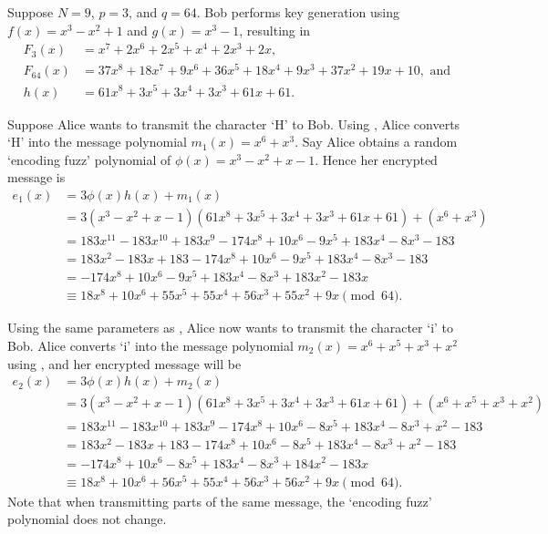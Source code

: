 \begin{example}\label{example-ntru-case-1}
    Suppose $N = 9$, $p = 3$, and $q = 64$. Bob performs key generation using $f(x) = x^3 - x^2 + 1$ and $g(x) = x^3 - 1$, resulting in
    \begin{align*}
        F_3(x) &= x^7 + 2x^6 + 2x^5 +x^4 + 2x^3 + 2x,\\
        F_{64}(x) &= 37x^8 + 18x^7 + 9x^6 + 36x^5 + 18x^4 + 9x^3 + 37x^2 + 19x + 10, \text{ and}\\
        h(x) &= 61x^8 + 3x^5 + 3x^4 + 3x^3 + 61x + 61.
    \end{align*}

    Suppose Alice wants to transmit the character `H' to Bob. Using , Alice converts `H' into the message polynomial $m_1(x) = x^6 + x^3$. Say Alice obtains a random `encoding fuzz' polynomial of $\phi(x) = x^{3} - x^{2} + x - 1$. Hence her encrypted message is
    \begin{align*}
        e_1(x) &= 3\phi(x)h(x) + m_1(x)\\
        &= 3(x^3 -x^2 +x - 1)(61x^8 + 3x^5 + 3x^4 + 3x^3 + 61x + 61) + (x^6 + x^3)\\
        &= 183x^{11} - 183x^{10} + 183x^9 - 174x^8 + 10x^6 - 9x^5 + 183x^4 - 8x^3 - 183\\
        &= 183x^2 - 183x + 183 - 174x^8 + 10x^6 - 9x^5 + 183x^4 - 8x^3 - 183\\
        &= -174x^8 + 10x^6 - 9x^5 + 183x^4 - 8x^3 + 183x^2 - 183x\\
        &\equiv 18x^8 + 10x^6 + 55x^5 + 55x^4 + 56x^3 + 55x^2 + 9x \pmod{64}.
    \end{align*}
\end{example}

\begin{example}\label{example-ntru-case-2}
    Using the same parameters as , Alice now wants to transmit the character `i' to Bob. Alice converts `i' into the message polynomial $m_2(x) = x^6 + x^5 + x^3 + x^2$ using , and her encrypted message will be
    \begin{align*}
        e_2(x) &= 3\phi(x)h(x) + m_2(x)\\
        &= 3(x^3 - x^2 + x - 1)(61x^8 + 3x^5 + 3x^4 + 3x^3 + 61x + 61) + (x^6 + x^5 + x^3 + x^2)\\
        &= 183x^{11} - 183x^{10} + 183x^9 - 174x^8 + 10x^6 - 8x^5 + 183x^4 - 8x^3 + x^2 - 183\\
        &= 183x^2 - 183x + 183 - 174x^8 + 10x^6 - 8x^5 + 183x^4 - 8x^3 + x^2 - 183\\
        &= -174x^8 + 10x^6 - 8x^5 + 183x^4 - 8x^3 + 184x^2 - 183x\\
        &\equiv 18x^8 + 10x^6 + 56x^5 + 55x^4 + 56x^3 + 56x^2 + 9x \pmod{64}.
    \end{align*}
    Note that when transmitting parts of the same message, the `encoding fuzz' polynomial does not change.
\end{example}

